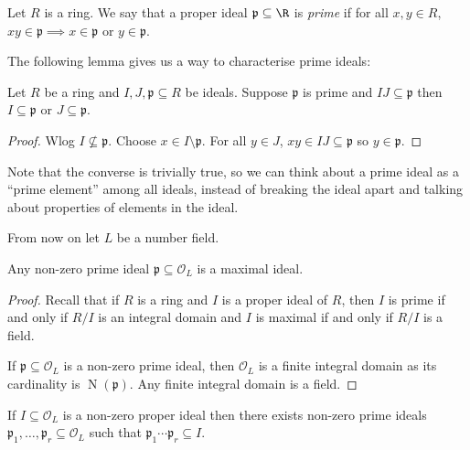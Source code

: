\documentclass[a4paper]{article}
\renewcommand*{\O}{\mathcal{O}}
\DeclareMathOperator{\n}{N}
\begin{document}
\begin{definition}
  Let \(R\) is a ring. We say that a proper ideal \(\mathfrak p \subseteq \R\) is \emph{prime} if for all \(x, y \in R\), \(xy \in \mathfrak p \implies x \in \mathfrak p \text{ or } y \in \mathfrak p\).
\end{definition}

The following lemma gives us a way to characterise prime ideals:
\begin{lemma}
  Let \(R\) be a ring and \(I, J, \mathfrak p \subseteq R\) be ideals. Suppose \(\mathfrak p\) is prime and \(IJ \subseteq \mathfrak{p}\) then \(I \subseteq \mathfrak{p}\) or \(J \subseteq \mathfrak{p}\).
\end{lemma}

\begin{proof}
  Wlog \(I \nsubseteq \mathfrak{p}\). Choose \(x \in I \setminus \mathfrak{p}\). For all \(y \in J\), \(xy \in IJ \subseteq \mathfrak{p}\) so \(y \in \mathfrak{p}\).
\end{proof}

Note that the converse is trivially true, so we can think about a prime ideal as a ``prime element'' among all ideals, instead of breaking the ideal apart and talking about properties of elements in the ideal.

From now on let \(L\) be a number field.

\begin{lemma}
  Any non-zero prime ideal \(\mathfrak{p} \subseteq \O_L\) is a maximal ideal.
\end{lemma}

\begin{proof}
  Recall that if \(R\) is a ring and \(I\) is a proper ideal of \(R\), then \(I\) is prime if and only if \(R/I\) is an integral domain and \(I\) is maximal if and only if \(R/I\) is a field.

  If \(\mathfrak{p} \subseteq \O_L\) is a non-zero prime ideal, then \(\O_L\) is a finite integral domain as its cardinality is \(\n(\mathfrak{p})\). Any finite integral domain is a field.
\end{proof}

\begin{lemma}
  If \(I \subseteq \O_L\) is a non-zero proper ideal then there exists non-zero prime ideals \(\mathfrak{p}_1, \dots, \mathfrak{p}_r \subseteq \O_L\) such that \(\mathfrak{p}_1 \cdots \mathfrak{p}_r \subseteq I\).
\end{lemma}
\end{document}
